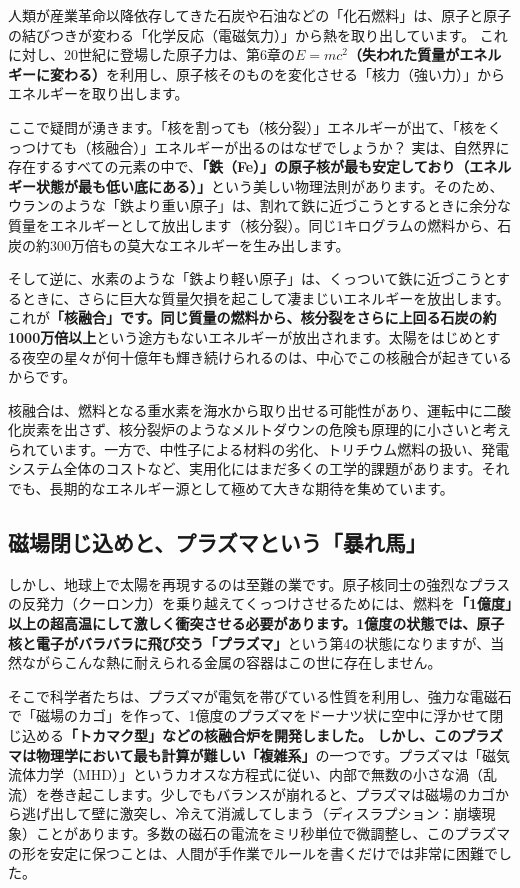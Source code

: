 人類が産業革命以降依存してきた石炭や石油などの「化石燃料」は、原子と原子の結びつきが変わる「化学反応（電磁気力）」から熱を取り出しています。 これに対し、20世紀に登場した原子力は、第6章の\textbf{\(E=mc^2\)（失われた質量がエネルギーに変わる）}を利用し、原子核そのものを変化させる「核力（強い力）」からエネルギーを取り出します。

ここで疑問が湧きます。「核を割っても（核分裂）」エネルギーが出て、「核をくっつけても（核融合）」エネルギーが出るのはなぜでしょうか？ 実は、自然界に存在するすべての元素の中で、\textbf{「鉄（Fe）」の原子核が最も安定しており（エネルギー状態が最も低い底にある）」}という美しい物理法則があります。そのため、ウランのような「鉄より重い原子」は、割れて鉄に近づこうとするときに余分な質量をエネルギーとして放出します（核分裂）。同じ1キログラムの燃料から、石炭の約300万倍もの莫大なエネルギーを生み出します。

そして逆に、水素のような「鉄より軽い原子」は、くっついて鉄に近づこうとするときに、さらに巨大な質量欠損を起こして凄まじいエネルギーを放出します。これが\textbf{「核融合」です。同じ質量の燃料から、核分裂をさらに上回る石炭の約1000万倍以上}という途方もないエネルギーが放出されます。太陽をはじめとする夜空の星々が何十億年も輝き続けられるのは、中心でこの核融合が起きているからです。

核融合は、燃料となる重水素を海水から取り出せる可能性があり、運転中に二酸化炭素を出さず、核分裂炉のようなメルトダウンの危険も原理的に小さいと考えられています。一方で、中性子による材料の劣化、トリチウム燃料の扱い、発電システム全体のコストなど、実用化にはまだ多くの工学的課題があります。それでも、長期的なエネルギー源として極めて大きな期待を集めています。

\subsection{磁場閉じ込めと、プラズマという「暴れ馬」}

しかし、地球上で太陽を再現するのは至難の業です。原子核同士の強烈なプラスの反発力（クーロン力）を乗り越えてくっつけさせるためには、燃料を\textbf{「1億度」以上の超高温にして激しく衝突させる必要があります。1億度の状態では、原子核と電子がバラバラに飛び交う「プラズマ」}という第4の状態になりますが、当然ながらこんな熱に耐えられる金属の容器はこの世に存在しません。

そこで科学者たちは、プラズマが電気を帯びている性質を利用し、強力な電磁石で「磁場のカゴ」を作って、1億度のプラズマをドーナツ状に空中に浮かせて閉じ込める\textbf{「トカマク型」などの核融合炉を開発しました。 しかし、このプラズマは物理学において最も計算が難しい「複雑系」}の一つです。プラズマは「磁気流体力学（MHD）」というカオスな方程式に従い、内部で無数の小さな渦（乱流）を巻き起こします。少しでもバランスが崩れると、プラズマは磁場のカゴから逃げ出して壁に激突し、冷えて消滅してしまう（ディスラプション：崩壊現象）ことがあります。多数の磁石の電流をミリ秒単位で微調整し、このプラズマの形を安定に保つことは、人間が手作業でルールを書くだけでは非常に困難でした。

